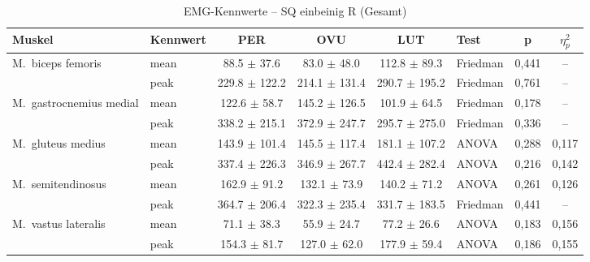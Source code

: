 \begin{table}[H]
  \centering
  \caption{EMG-Kennwerte – SQ einbeinig R (Gesamt)}
  \label{tab:SQ_einbeinig_R_Gesamt}
  \small
  \begin{tabular}{l l c c c l c c}
    \hline
    \textbf{Muskel} & \textbf{Kennwert} & \textbf{PER} & \textbf{OVU} & \textbf{LUT} & \textbf{Test} & \textbf{p} & \textbf{$\eta^2_p$} \\
    \hline
    M.~biceps femoris & mean & 88.5 $\pm$ 37.6 & 83.0 $\pm$ 48.0 & 112.8 $\pm$ 89.3 & Friedman & 0{,}441 & -- \\
     & peak & 229.8 $\pm$ 122.2 & 214.1 $\pm$ 131.4 & 290.7 $\pm$ 195.2 & Friedman & 0{,}761 & -- \\
    \hline
    M.~gastrocnemius medial & mean & 122.6 $\pm$ 58.7 & 145.2 $\pm$ 126.5 & 101.9 $\pm$ 64.5 & Friedman & 0{,}178 & -- \\
     & peak & 338.2 $\pm$ 215.1 & 372.9 $\pm$ 247.7 & 295.7 $\pm$ 275.0 & Friedman & 0{,}336 & -- \\
    \hline
    M.~gluteus medius & mean & 143.9 $\pm$ 101.4 & 145.5 $\pm$ 117.4 & 181.1 $\pm$ 107.2 & ANOVA & 0{,}288 & 0{,}117 \\
     & peak & 337.4 $\pm$ 226.3 & 346.9 $\pm$ 267.7 & 442.4 $\pm$ 282.4 & ANOVA & 0{,}216 & 0{,}142 \\
    \hline
    M.~semitendinosus & mean & 162.9 $\pm$ 91.2 & 132.1 $\pm$ 73.9 & 140.2 $\pm$ 71.2 & ANOVA & 0{,}261 & 0{,}126 \\
     & peak & 364.7 $\pm$ 206.4 & 322.3 $\pm$ 235.4 & 331.7 $\pm$ 183.5 & Friedman & 0{,}441 & -- \\
    \hline
    M.~vastus lateralis & mean & 71.1 $\pm$ 38.3 & 55.9 $\pm$ 24.7 & 77.2 $\pm$ 26.6 & ANOVA & 0{,}183 & 0{,}156 \\
     & peak & 154.3 $\pm$ 81.7 & 127.0 $\pm$ 62.0 & 177.9 $\pm$ 59.4 & ANOVA & 0{,}186 & 0{,}155 \\
    \hline
  \end{tabular}
\end{table}
